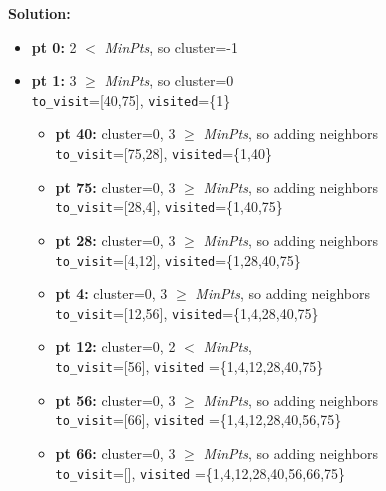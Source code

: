 \documentclass[11pt]{article}
\begin{document}
	\textbf{Solution:}\\
		\begin{itemize}[label=$\star$]
			\item \textbf{pt 0:} 2 $<$ \textit{MinPts}, so cluster=-1
			\item \textbf{pt 1:} 3 $\ge$ \textit{MinPts}, so cluster=0 \\ \texttt{to\_visit}=[40,75], \texttt{visited}=\{1\}
			\begin{itemize}[label=$\cdot$]
				\item \textbf{pt 40:} cluster=0, 3 $\ge$ \textit{MinPts}, so adding neighbors \\ \texttt{to\_visit}=[75,28], \texttt{visited}=\{1,40\}
				\item \textbf{pt 75:} cluster=0, 3 $\ge$ \textit{MinPts}, so adding neighbors \\ \texttt{to\_visit}=[28,4], \texttt{visited}=\{1,40,75\}
				\item \textbf{pt 28:} cluster=0, 3 $\ge$ \textit{MinPts}, so adding neighbors \\ \texttt{to\_visit}=[4,12], \texttt{visited}=\{1,28,40,75\}
				\item \textbf{pt 4:} cluster=0, 3 $\ge$ \textit{MinPts}, so adding neighbors \\ \texttt{to\_visit}=[12,56], \texttt{visited}=\{1,4,28,40,75\}
				\item \textbf{pt 12:} cluster=0, 2 $<$ \textit{MinPts}, \\ \texttt{to\_visit}=[56], \texttt{visited} =\{1,4,12,28,40,75\}
				\item \textbf{pt 56:} cluster=0, 3 $\ge$ \textit{MinPts}, so adding neighbors \\ \texttt{to\_visit}=[66], \texttt{visited} =\{1,4,12,28,40,56,75\}
				\item \textbf{pt 66:} cluster=0, 3 $\ge$ \textit{MinPts}, so adding neighbors \\ \texttt{to\_visit}=[], \texttt{visited} =\{1,4,12,28,40,56,66,75\}
			\end{itemize}
		

\end{itemize}
\end{document}
